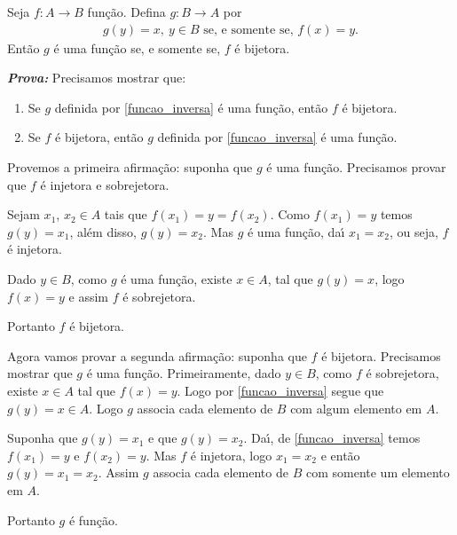 \documentclass{beamer}
\begin{document}
    \begin{frame}
\begin{teorema}\label{teorema_funcao_inversa}
    Seja $f: A \to B$ fun{\c c}{\~a}o. Defina $g : B \to A$ por
    \begin{align}\label{funcao_inversa}
        g(y) = x,\ y \in B \mbox{ se, e somente se, } f(x) = y.
    \end{align}
    Ent{\~a}o $g$ {\'e} uma fun{\c c}{\~a}o se, e somente se, $f$ {\'e} bijetora.
\end{teorema}
    \noindent \textbf{\textit{Prova:}}
    Precisamos mostrar que:
    \begin{enumerate}[label={\roman*})]
        \item Se $g$ definida por \eqref{funcao_inversa} \'e uma fun\c{c}\~ao, ent\~ao $f$ \'e bijetora.
        \item Se $f$ \'e bijetora, ent\~ao $g$ definida por \eqref{funcao_inversa} \'e uma fun\c{c}\~ao.
    \end{enumerate}

    Provemos a primeira afirma\c{c}\~ao: suponha que $g$ \'e uma fun\c{c}\~ao. Precisamos provar que $f$ {\'e} injetora e sobrejetora.

    Sejam $x_1$, $x_2 \in A$ tais que $f(x_1) = y = f(x_2)$. Como $f(x_1) = y$ temos $g(y) = x_1$, al{\'e}m disso, $g(y) = x_2$. Mas $g$ {\'e} uma fun{\c c}{\~a}o, da{\'\i} $x_1 = x_2$, ou seja, $f$ {\'e} injetora.
    \end{frame}

    \begin{frame}

    Dado $y \in B$, como $g$ {\'e} uma fun{\c c}{\~a}o, existe $x \in A$, tal que $g(y) = x$, logo $f(x) = y$ e assim $f$ {\'e} sobrejetora.

    Portanto $f$ {\'e} bijetora.

    Agora vamos provar a segunda afirma\c{c}\~ao: suponha que $f$ \'e bijetora. Precisamos mostrar que $g$ \'e uma fun\c{c}\~ao. Primeiramente, dado $y \in B$, como $f$ {\'e} sobrejetora, existe $x \in A$ tal que $f(x) = y$. Logo por \eqref{funcao_inversa} segue que $g(y) = x \in A$. Logo $g$ associa cada elemento de $B$ com algum elemento em $A$.

    Suponha que $g(y) = x_1$ e que $g(y) = x_2$. Da{\'\i}, de \eqref{funcao_inversa} temos $f(x_1) = y$ e $f(x_2) = y$. Mas $f$ {\'e} injetora, logo $x_1 = x_2$ e ent{\~a}o $g(y) = x_1 = x_2$. Assim $g$ associa cada elemento de $B$ com somente um elemento em $A$.

    Portanto $g$ {\'e} fun{\c c}{\~a}o.
    \end{frame}
\end{document}
